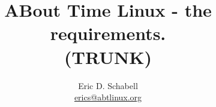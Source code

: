 \documentclass[a4paper]{article}
\begin{document}
\title{ABout Time Linux - the requirements.\\ (TRUNK)}

\author{Eric D. Schabell \\ \url{erics@abtlinux.org}}

\maketitle








  
\end{document}
